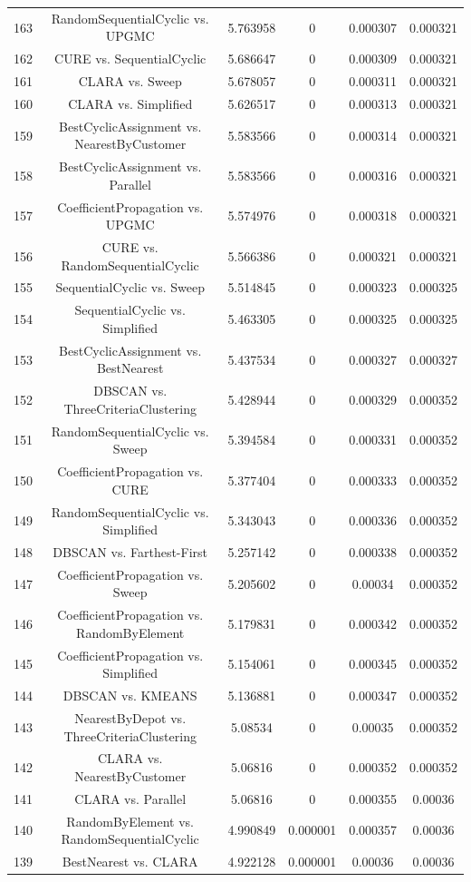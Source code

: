 \documentclass[a4paper,10pt]{article}
\begin{document}
\begin{landscape}
\begin{table}[!htp]
\begin{tabular}{cccccc}
163&RandomSequentialCyclic vs. UPGMC&5.763958&0&0.000307&0.000321\\
162&CURE vs. SequentialCyclic&5.686647&0&0.000309&0.000321\\
161&CLARA vs. Sweep&5.678057&0&0.000311&0.000321\\
160&CLARA vs. Simplified&5.626517&0&0.000313&0.000321\\
159&BestCyclicAssignment vs. NearestByCustomer&5.583566&0&0.000314&0.000321\\
158&BestCyclicAssignment vs. Parallel&5.583566&0&0.000316&0.000321\\
157&CoefficientPropagation vs. UPGMC&5.574976&0&0.000318&0.000321\\
156&CURE vs. RandomSequentialCyclic&5.566386&0&0.000321&0.000321\\
155&SequentialCyclic vs. Sweep&5.514845&0&0.000323&0.000325\\
154&SequentialCyclic vs. Simplified&5.463305&0&0.000325&0.000325\\
153&BestCyclicAssignment vs. BestNearest&5.437534&0&0.000327&0.000327\\
152&DBSCAN vs. ThreeCriteriaClustering&5.428944&0&0.000329&0.000352\\
151&RandomSequentialCyclic vs. Sweep&5.394584&0&0.000331&0.000352\\
150&CoefficientPropagation vs. CURE&5.377404&0&0.000333&0.000352\\
149&RandomSequentialCyclic vs. Simplified&5.343043&0&0.000336&0.000352\\
148&DBSCAN vs. Farthest-First&5.257142&0&0.000338&0.000352\\
147&CoefficientPropagation vs. Sweep&5.205602&0&0.00034&0.000352\\
146&CoefficientPropagation vs. RandomByElement&5.179831&0&0.000342&0.000352\\
145&CoefficientPropagation vs. Simplified&5.154061&0&0.000345&0.000352\\
144&DBSCAN vs. KMEANS&5.136881&0&0.000347&0.000352\\
143&NearestByDepot vs. ThreeCriteriaClustering&5.08534&0&0.00035&0.000352\\
142&CLARA vs. NearestByCustomer&5.06816&0&0.000352&0.000352\\
141&CLARA vs. Parallel&5.06816&0&0.000355&0.00036\\
140&RandomByElement vs. RandomSequentialCyclic&4.990849&0.000001&0.000357&0.00036\\
139&BestNearest vs. CLARA&4.922128&0.000001&0.00036&0.00036\\

\end{tabular}
\end{table}
\end{landscape}
\end{document}
